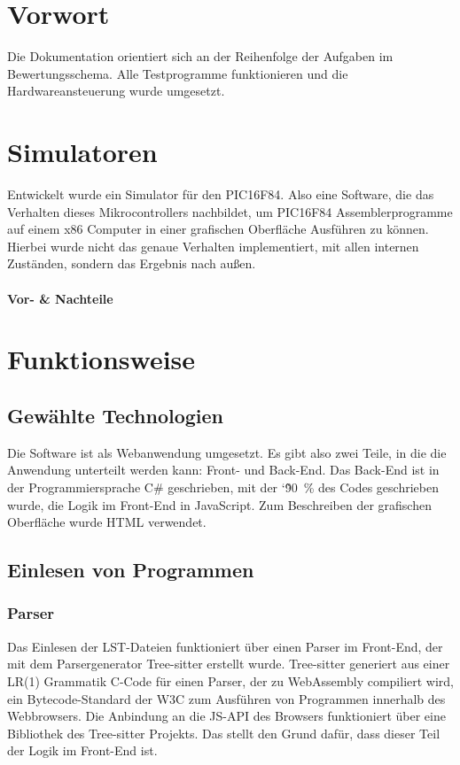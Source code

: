 \section{Vorwort}
Die Dokumentation orientiert sich an der Reihenfolge der Aufgaben im Bewertungsschema.
Alle Testprogramme funktionieren und die Hardwareansteuerung wurde umgesetzt.



\section{Simulatoren}
Entwickelt wurde ein Simulator für den PIC16F84.
Also eine Software, die das Verhalten dieses Mikrocontrollers nachbildet,
um PIC16F84 Assemblerprogramme auf einem x86 Computer in einer grafischen Oberfläche Ausführen zu können.
Hierbei wurde nicht das genaue Verhalten implementiert, mit allen internen Zuständen,
sondern das Ergebnis nach außen.

\paragraph{Vor- \& Nachteile}



\section{Funktionsweise}

\subsection{Gewählte Technologien}
Die Software ist als Webanwendung umgesetzt.
Es gibt also zwei Teile, in die die Anwendung unterteilt werden kann:
Front- und Back-End.
Das Back-End ist in der Programmiersprache C\# geschrieben, mit der \char`\~90~\% des Codes geschrieben wurde,
die Logik im Front-End in JavaScript.
Zum Beschreiben der grafischen Oberfläche wurde HTML verwendet.


\subsection{Einlesen von Programmen}

\subsubsection{Parser}
Das Einlesen der LST-Dateien funktioniert über einen Parser im Front-End,
der mit dem Parsergenerator Tree-sitter erstellt wurde.
Tree-sitter generiert aus einer LR(1) Grammatik C-Code für einen Parser,
der zu WebAssembly compiliert wird, ein Bytecode-Standard der W3C zum Ausführen von Programmen innerhalb des Webbrowsers.
Die Anbindung an die JS-API des Browsers funktioniert über eine 
Bibliothek des Tree-sitter Projekts.
Das stellt den Grund dafür, dass dieser Teil der Logik im Front-End ist. 

